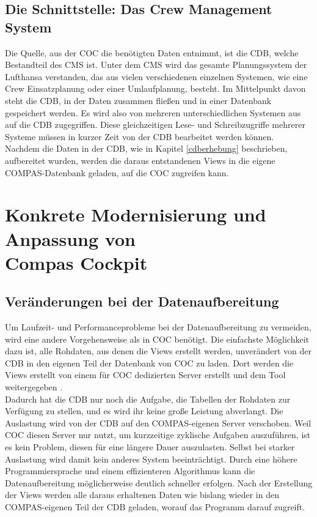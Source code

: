 \documentclass [12pt, a4paper, oneside, titlepage, ngerman]{article}
\begin{document}
\subsection {Die Schnittstelle: Das Crew Management System}
Die Quelle, aus der \ac{COC} die benötigten Daten entnimmt, ist die \ac{CDB}, welche Bestandteil des \ac{CMS} ist. Unter dem \ac{CMS} wird das gesamte Planungssystem der Lufthansa verstanden, das aus vielen verschiedenen einzelnen Systemen, wie eine Crew Einsatzplanung oder einer Umlaufplanung, besteht. Im Mittelpunkt davon steht die \ac{CDB}, in der Daten zusammen fließen und in einer Datenbank gespeichert werden. Es wird also von mehreren unterschiedlichen Systemen aus auf die \ac{CDB} zugegriffen. Diese gleichzeitigen Lese- und Schreibzugriffe mehrerer Systeme müssen in kurzer Zeit von der \ac{CDB} bearbeitet werden können.\\
Nachdem die Daten in der \ac{CDB}, wie in Kapitel \ref{cdberhebung} beschrieben, aufbereitet wurden, werden die daraus entstandenen Views in die eigene COMPAS-Datenbank geladen, auf die \ac{COC} zugreifen kann. 

\newpage
\section [Konkrete Modernisierung und Anpassung von COMPAS Cockpit]{Konkrete Modernisierung und Anpassung von \\ Compas Cockpit}
\subsection{Veränderungen bei der Datenaufbereitung}
Um Laufzeit- und Performanceprobleme bei der Datenaufbereitung zu vermeiden, wird eine andere Vorgehensweise als in \ac{COC} benötigt. Die einfachste Möglichkeit dazu ist, alle Rohdaten, aus denen die Views erstellt werden, unverändert von der \ac{CDB} in den eigenen Teil der Datenbank von \ac{COC} zu laden. Dort werden die Views erstellt von einem für \ac{COC} dedizierten Server erstellt und dem Tool weitergegeben \cite[vgl. dazu][]{Gespraech5}. \\
Dadurch hat die \ac{CDB} nur noch die Aufgabe, die Tabellen der Rohdaten zur Verfügung zu stellen, und es wird ihr keine große Leistung abverlangt. Die Auslastung wird von der \ac{CDB} auf den COMPAS-eigenen Server verschoben. Weil \ac{COC} diesen Server nur nutzt, um kurzzeitige zyklische Aufgaben auszuführen, ist es kein Problem, diesen für eine längere Dauer auszulasten. Selbst bei starker Auslastung wird damit kein anderes System beeinträchtigt. Durch eine höhere Programmiersprache und einem effizienteren Algorithmus kann die Datenaufbereitung möglicherweise deutlich schneller erfolgen. Nach der Erstellung der Views werden alle daraus erhaltenen Daten wie bislang wieder in den COMPAS-eigenen Teil der \ac{CDB} geladen, worauf das Programm darauf zugreift. \\
\end{document}

